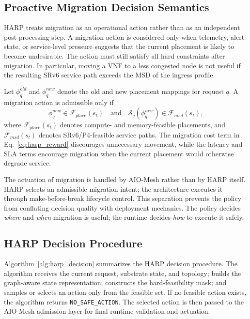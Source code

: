 \documentclass[final,5p]{elsarticle}
\begin{document}
\subsection{Proactive Migration Decision Semantics}
\label{subsec:harp_migration}

HARP treats migration as an operational action rather than as an independent post-processing step. A migration action is considered only when telemetry, alert state, or service-level pressure suggests that the current placement is likely to become undesirable. The action must still satisfy all hard constraints after migration. In particular, moving a VNF to a less congested node is not useful if the resulting SRv6 service path exceeds the MSD of the ingress profile.

Let \(\phi^{old}_q\) and \(\phi^{new}_q\) denote the old and new placement mappings for request \(q\). A migration action is admissible only if
\begin{equation}
    \phi^{new}_q \in \mathcal{F}_{place}(s_t)
    \quad \text{and} \quad
    \mathcal{S}_q(\phi^{new}_q) \in \mathcal{F}_{msd}(s_t),
\end{equation}
where \(\mathcal{F}_{place}(s_t)\) denotes compute- and memory-feasible placements, and \(\mathcal{F}_{msd}(s_t)\) denotes SRv6/P4-feasible service paths. The migration cost term in Eq.~\eqref{eq:harp_reward} discourages unnecessary movement, while the latency and SLA terms encourage migration when the current placement would otherwise degrade service.

The actuation of migration is handled by AIO-Mesh rather than by HARP itself. HARP selects an admissible migration intent; the architecture executes it through make-before-break lifecycle control. This separation prevents the policy from conflating decision quality with deployment mechanics. The policy decides \textit{where} and \textit{when} migration is useful; the runtime decides \textit{how} to execute it safely.

\subsection{HARP Decision Procedure}
\label{subsec:harp_decision_procedure}

Algorithm~\ref{alg:harp_decision} summarizes the HARP decision procedure. The algorithm receives the current request, substrate state, and topology; builds the graph-aware state representation; constructs the hard-feasibility mask; and samples or selects an action only from the feasible set. If no feasible action exists, the algorithm returns \texttt{NO\_SAFE\_ACTION}. The selected action is then passed to the AIO-Mesh admission layer for final runtime validation and actuation.
\end{document}
